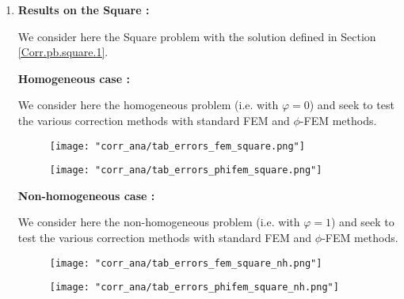 \begin{enumerate}[label=\textbullet]
	\item \textbf{Results on the Square :}
	
	We consider here the Square problem with the solution defined in Section \ref{Corr.pb.square.1}.
	
	\textbf{Homogeneous case :}
	
	We consider here the homogeneous problem (i.e. with $\varphi=0$) and seek to test the various correction methods with standard FEM and $\phi$-FEM methods.
	
	\begin{minipage}{0.48\linewidth}
		\begin{figure}[H]
			\centering
			\texttt{[image: "corr\_ana/tab\_errors\_fem\_square.png"]}
			\label{tab_errors_fem_square}
		\end{figure} 
	\end{minipage}
	\begin{minipage}{0.48\linewidth} \qquad 
		\begin{figure}[H]
			\centering
			\texttt{[image: "corr\_ana/tab\_errors\_phifem\_square.png"]}
			\label{tab_errors_phifem_square}
		\end{figure} 
	\end{minipage}
	
	\textbf{Non-homogeneous case :}
	
	We consider here the non-homogeneous problem (i.e. with $\varphi=1$) and seek to test the various correction methods with standard FEM and $\phi$-FEM methods.
	
	\begin{minipage}{0.48\linewidth}
		\begin{figure}[H]
			\centering
			\texttt{[image: "corr\_ana/tab\_errors\_fem\_square\_nh.png"]}
			\label{tab_errors_fem_square_nh}
		\end{figure} 
	\end{minipage}
	\begin{minipage}{0.48\linewidth} \qquad 
		\begin{figure}[H]
			\centering
			\texttt{[image: "corr\_ana/tab\_errors\_phifem\_square\_nh.png"]}
			\label{tab_errors_phifem_square_nh}
		\end{figure} 
	\end{minipage}
\end{enumerate}

